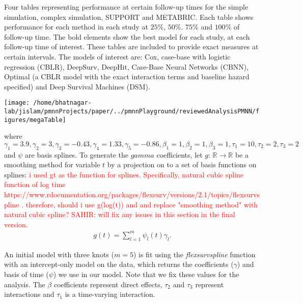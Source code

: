 \documentclass[AMA,STIX1COL,]{WileyNJD-v2}
\newcommand{\srb}[1]{\textsf{\textcolor{red}{#1}}}
\begin{document}
\FloatBarrier
\begin{table}
\caption{Four tables representing performance at certain follow-up times for the simple simulation, complex simulation, SUPPORT and METABRIC. Each table shows performance for each method in each study at $25\%$, $50\%$. $75\%$ and $100\%$ of follow-up time. The bold elements show the best model for each study, at each follow-up time of interest. These tables are included to provide exact measures at certain intervals. The models of interest are: Cox, case-base with logistic regression (CBLR), DeepSurv, DeepHit, Case-Base Neural Networks (CBNN), Optimal (a CBLR model with the exact interaction terms and baseline hazard specified) and Deep Survival Machines (DSM).}
\label{tab:megaTable}

\begin{center}\texttt{[image: /home/bhatnagar-lab/jislam/pmnnProjects/paper/../pmnnPlayground/reviewedAnalysisPMNN/figures/megaTable]} \end{center}

\end{table}
\FloatBarrier

where
\(\gamma_{1}=3.9, \gamma_{2}=3, \gamma_{3}=-0.43, \gamma_{4}=1.33,\gamma_{5}=-0.86, \beta_{{1}}=1, \beta_{{2}}=1, \beta_{{3}}=1, \tau_{1}=10, \tau_{2}=2, \tau_{3}=2\)
and \(\psi\) are basis splines. To generate the \(gamma\) coefficients,
let \(g\): \(\mathbb{R} \rightarrow \mathbb{R}\) be a smoothing method
for variable \(t\) by a projection on to a set of basis functions on
splines:
\srb{i used gt as the function for splines. Specifically, natural cubic spline function of log time https://www.rdocumentation.org/packages/flexsurv/versions/2.1/topics/flexsurvspline . therefore, should i use g(log(t)) and and replace "smoothing method" with natural cubic spline? SAHIR: will fix any issues in this section in the final version.}
\begin{align}
g(t)=\sum^{m}_{l=1}\psi_{l} (t)\gamma_{l}.
\end{align}

An initial model with three knots (\(m=5\)) is fit using the
\emph{flexsurvspline} function with an intercept-only model on the data,
which returns the coefficients (\(\gamma\)) and basis of time (\(\psi\))
we use in our model. Note that we fix these values for the analysis. The
\(\beta\) coefficients represent direct effects, \(\tau_{2}\) and
\({\tau_3}\) represent interactions and \(\tau_{1}\) is a time-varying
interaction.
\end{document}
